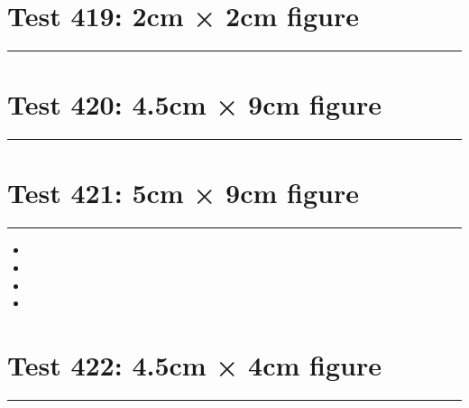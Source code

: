 \documentclass[a4paper,11pt]{article}
\begin{document}
\section*{Test 419: 2cm × 2cm figure}
\begin{swarmwrap}%
  \begin{minipage}[t]{2cm}
    \centering
    \rule{\linewidth}{2cm}
  \end{minipage}%
\end{swarmwrap}%
\swarmwrapnext
\lipsum[109]
\lipsum[110]
\lipsum[111]
\lipsum[112]
\section*{Test 420: 4.5cm × 9cm figure}
\begin{swarmwrap}%
  \begin{minipage}[t]{4cm}
    \centering
    \rule{\linewidth}{9cm}
  \end{minipage}%
\end{swarmwrap}%
\swarmwrapnext
\lipsum[30]
\lipsum[31]
\lipsum[32]
\section*{Test 421: 5cm × 9cm figure}
\begin{swarmwrap}%
  \begin{minipage}[t]{5cm}
    \centering
    \rule{\linewidth}{9cm}
  \end{minipage}%
\end{swarmwrap}
\begin{itemize}
  \item \swarmwrapnext\lipsum[132][1-4]
  \item \lipsum[134][1-3]
  \item \lipsum[135][1-3]
  \item \lipsum[136][1-3]
\end{itemize}
\section*{Test 422: 4.5cm × 4cm figure}
\begin{swarmwrap}%
  \begin{minipage}[t]{4cm}
    \centering
    \rule{\linewidth}{4cm}
  \end{minipage}%
\end{swarmwrap}%
\swarmwrapnext
\lipsum[111]
\lipsum[112]
\lipsum[113]
\lipsum[114]
\lipsum[115]
\end{document}

